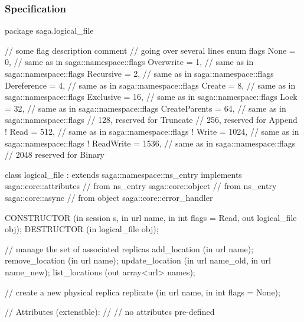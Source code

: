  \subsubsection{Specification}
 
 \begin{myspec}
  package saga.logical_file
  {
    // some flag description comment
    // going over several lines
    enum flags
    {
      None            =    0, // same as in saga::namespace::flags
      Overwrite       =    1, // same as in saga::namespace::flags
      Recursive       =    2, // same as in saga::namespace::flags
      Dereference     =    4, // same as in saga::namespace::flags
      Create          =    8, // same as in saga::namespace::flags
      Exclusive       =   16, // same as in saga::namespace::flags
      Lock            =   32, // same as in saga::namespace::flags
      CreateParents   =   64, // same as in saga::namespace::flags
      //                 128,    reserved for Truncate
      //                 256,    reserved for Append
!     Read            =  512, // same as in saga::namespace::flags 
!     Write           = 1024, // same as in saga::namespace::flags 
!     ReadWrite       = 1536, // same as in saga::namespace::flags 
      //                2048     reserved for Binary
    }
 
 
    class logical_file : extends        saga::namespace::ns_entry
                         implements     saga::core::attributes
                      // from ns_entry  saga::core::object
                      // from ns_entry  saga::core::async
                      // from object    saga::core::error_handler
    {
      CONSTRUCTOR     (in  session             s,
                       in  url                 name,
                       in  int                 flags = Read,
                       out logical_file        obj);
      DESTRUCTOR      (in  logical_file        obj);
 
 
      // manage the set of associated replicas
      add_location    (in  url                 name);
      remove_location (in  url                 name);
      update_location (in  url                 name_old,
                       in  url                 name_new);
      list_locations  (out array<url>          names);
 
      // create a new physical replica
      replicate       (in  url                 name, 
                       in  int                 flags = None);
 
      // Attributes (extensible):
      // 
      // no attributes pre-defined
    }
 
}
\end{myspec}

